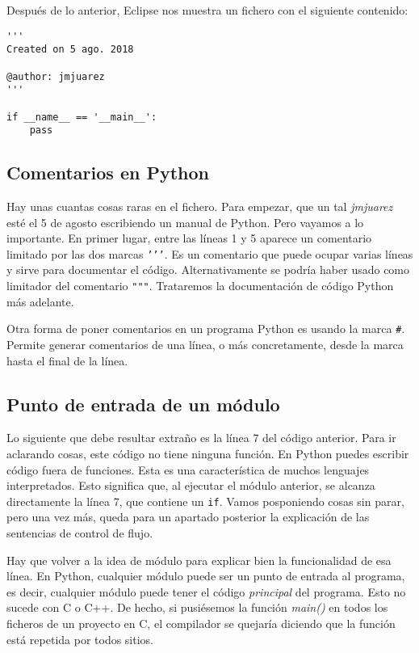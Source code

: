 Después de lo anterior, Eclipse nos muestra un fichero con el siguiente contenido:

\begin{lstlisting}
'''
Created on 5 ago. 2018

@author: jmjuarez
'''

if __name__ == '__main__':
    pass
\end{lstlisting}

\subsection{Comentarios en Python}\label{sec:comentarios}

Hay unas cuantas cosas raras en el fichero. Para empezar, que un tal \emph{jmjuarez} esté el 5 de agosto escribiendo un manual de Python. Pero vayamos a lo importante. En primer lugar, entre las líneas 1 y 5 aparece un comentario limitado por las dos marcas \texttt{'{}'{}'{}}. Es un comentario que puede ocupar varias líneas y sirve para documentar el código. Alternativamente se podría haber usado como limitador del comentario \texttt{"{}"{}"{}}. Trataremos la documentación de código Python más adelante. 

Otra forma de poner comentarios en un programa Python es usando la marca \texttt{\#}. Permite generar comentarios de una línea, o más concretamente, desde la marca hasta el final de la línea.

\subsection{Punto de entrada de un módulo}

Lo siguiente que debe resultar extraño es la línea 7 del código anterior. Para ir aclarando cosas, este código no tiene ninguna función. En Python puedes escribir código fuera de funciones. Esta es una característica de muchos lenguajes interpretados. Esto significa que, al ejecutar el módulo anterior, se alcanza directamente la línea 7, que contiene un \texttt{if}. Vamos posponiendo cosas sin parar, pero una vez más, queda para un apartado posterior la explicación de las sentencias de control de flujo. 

Hay que volver a la idea de módulo para explicar bien la funcionalidad de esa línea. En Python, cualquier módulo puede ser un punto de entrada al programa, es decir, cualquier módulo puede tener el código \emph{principal} del programa. Esto no sucede con C o C++. De hecho, si pusiésemos la función \emph{main()} en todos los ficheros de un proyecto en C, el compilador se quejaría diciendo que la función está repetida por todos sitios.

